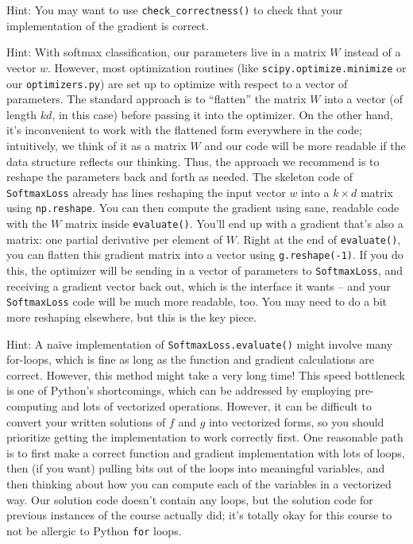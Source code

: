 \documentclass{article}
\begin{document}
Hint: You may want to use \verb|check_correctness()| to check that your implementation of the gradient is correct.

Hint: With softmax classification, our parameters live in a matrix $W$ instead of a vector $w$. However, most optimization routines (like \verb|scipy.optimize.minimize| or our \verb|optimizers.py|) are set up to optimize with respect to a vector of parameters. The standard approach is to ``flatten'' the matrix $W$ into a vector (of length $kd$, in this case) before passing it into the optimizer. On the other hand, it's inconvenient to work with the flattened form everywhere in the code; intuitively, we think of it as a matrix $W$ and our code will be more readable if the data structure reflects our thinking. Thus, the approach we recommend is to reshape the parameters back and forth as needed. The skeleton code of \verb|SoftmaxLoss| already has lines reshaping the input vector $w$ into a $k \times d$ matrix using \verb|np.reshape|. You can then compute the gradient using sane, readable code with the $W$ matrix inside \verb|evaluate()|. You'll end up with a gradient that's also a matrix: one partial derivative per element of $W$. Right at the end of \verb|evaluate()|, you can flatten this gradient matrix into a vector using \verb|g.reshape(-1)|. If you do this, the optimizer will be sending in a vector of parameters to \verb|SoftmaxLoss|, and receiving a gradient vector back out, which is the interface it wants -- and your \verb|SoftmaxLoss| code will be much more readable, too. You may need to do a bit more reshaping elsewhere, but this is the key piece.

Hint: A na\"ive implementation of \verb|SoftmaxLoss.evaluate()| might involve many for-loops, which is fine as long as the function and gradient calculations are correct. However, this method might take a very long time! This speed bottleneck is one of Python's shortcomings, which can be addressed by employing pre-computing and lots of vectorized operations. However, it can be difficult to convert your written solutions of $f$ and $g$ into vectorized forms, so you should prioritize getting the implementation to work correctly first. One reasonable path is to first make a correct function and gradient implementation with lots of loops, then (if you want) pulling bits out of the loops into meaningful variables, and then thinking about how you can compute each of the variables in a vectorized way. Our solution code doesn't contain any loops, but the solution code for previous instances of the course actually did; it's totally okay for this course to not be allergic to Python \verb|for| loops.
\pagebreak
\end{document}
